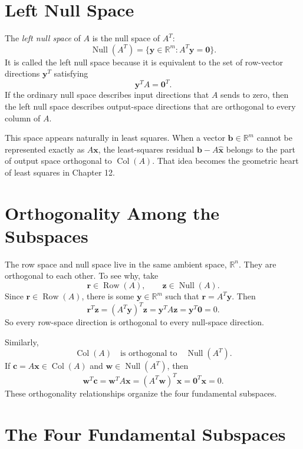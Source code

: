 \section{Left Null Space}
\label{mf:left-null-space}

The \emph{left null space} of \(A\) is the null space of \(A^T\):
\[
    \operatorname{Null}(A^T)
    =\{\mathbf{y}\in\mathbb{R}^m:A^T\mathbf{y}=\mathbf{0}\}.
\]
It is called the left null space because it is equivalent to the set of row-vector directions \(\mathbf{y}^T\) satisfying
\[
    \mathbf{y}^T A=\mathbf{0}^T.
\]
If the ordinary null space describes input directions that \(A\) sends to zero, then the left null space describes output-space directions that are orthogonal to every column of \(A\).

This space appears naturally in least squares. When a vector \(\mathbf{b}\in\mathbb{R}^m\) cannot be represented exactly as \(A\mathbf{x}\), the least-squares residual \(\mathbf{b}-A\widehat{\mathbf{x}}\) belongs to the part of output space orthogonal to \(\operatorname{Col}(A)\). That idea becomes the geometric heart of least squares in Chapter 12.

\section{Orthogonality Among the Subspaces}
\label{mf:orthogonal-subspaces}

The row space and null space live in the same ambient space, \(\mathbb{R}^n\). They are orthogonal to each other. To see why, take
\[
    \mathbf{r}\in\operatorname{Row}(A),
    \qquad
    \mathbf{z}\in\operatorname{Null}(A).
\]
Since \(\mathbf{r}\in\operatorname{Row}(A)\), there is some \(\mathbf{y}\in\mathbb{R}^m\) such that \(\mathbf{r}=A^T\mathbf{y}\). Then
\[
    \mathbf{r}^T\mathbf{z}
    =(A^T\mathbf{y})^T\mathbf{z}
    =\mathbf{y}^T A\mathbf{z}
    =\mathbf{y}^T\mathbf{0}
    =0.
\]
So every row-space direction is orthogonal to every null-space direction.

Similarly,
\[
    \operatorname{Col}(A)
    \quad\text{is orthogonal to}\quad
    \operatorname{Null}(A^T).
\]
If \(\mathbf{c}=A\mathbf{x}\in\operatorname{Col}(A)\) and \(\mathbf{w}\in\operatorname{Null}(A^T)\), then
\[
    \mathbf{w}^T\mathbf{c}
    =\mathbf{w}^T A\mathbf{x}
    =(A^T\mathbf{w})^T\mathbf{x}
    =\mathbf{0}^T\mathbf{x}
    =0.
\]
These orthogonality relationships organize the four fundamental subspaces.

\section{The Four Fundamental Subspaces}
\label{mf:four-subspaces}

